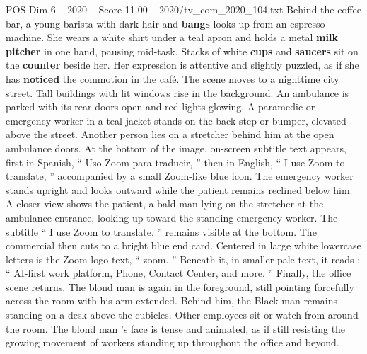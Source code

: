 \begin{textsample}{POS Dim 6 – 2020 – Score 11.00 – 2020/tv\_com\_2020\_104.txt}
Behind the coffee bar, a young barista with dark hair and \textbf{bangs} looks up from an espresso machine.
She wears a white shirt under a teal apron and holds a metal \textbf{milk} \textbf{pitcher} in one hand, pausing mid-task.
Stacks of white \textbf{cups} and \textbf{saucers} sit on the \textbf{counter} beside her.
Her expression is attentive and slightly puzzled, as if she has \textbf{noticed} the commotion in the café.
The scene moves to a nighttime city street.
Tall buildings with lit windows rise in the background.
An ambulance is parked with its rear doors open and red lights glowing.
A paramedic or emergency worker in a teal jacket stands on the back step or bumper, elevated above the street.
Another person lies on a stretcher behind him at the open ambulance doors.
At the bottom of the image, on-screen subtitle text appears, first in Spanish, “ Uso Zoom para traducir, ” then in English, “ I use Zoom to translate, ” accompanied by a small Zoom-like blue icon.
The emergency worker stands upright and looks outward while the patient remains reclined below him.
A closer view shows the patient, a bald man lying on the stretcher at the ambulance entrance, looking up toward the standing emergency worker.
The subtitle “ I use Zoom to translate. ” remains visible at the bottom.
The commercial then cuts to a bright blue end card.
Centered in large white lowercase letters is the Zoom logo text, “ zoom. ” Beneath it, in smaller pale text, it reads : “ AI-first work platform, Phone, Contact Center, and more. ” Finally, the office scene returns.
The blond man is again in the foreground, still pointing forcefully across the room with his arm extended.
Behind him, the Black man remains standing on a desk above the cubicles.
Other employees sit or watch from around the room.
The blond man ’s face is tense and animated, as if still resisting the growing movement of workers standing up throughout the office and beyond.

\end{textsample}
